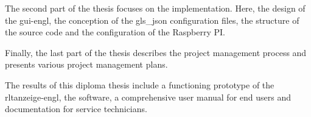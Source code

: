 The second part of the thesis focuses on the implementation. Here, the design of the \acf{gui-engl}, the conception of the \gls{gls_json} configuration files, the structure of the source code and the configuration of the Raspberry PI. 

Finally, the last part of the thesis describes the project management process and presents various project management plans.

The results of this diploma thesis include a functioning prototype of the \ac{rltanzeige-engl}, the software, a comprehensive user manual for end users and documentation for service technicians.


